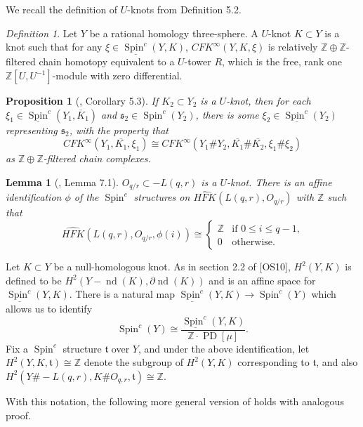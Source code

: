 \documentclass{article}
\newtheorem{lemma}[equation]{Lemma}
\newtheorem{proposition}[equation]{Proposition}
\theoremstyle{remark}
\newtheorem{definition}[equation]{Definition}
\numberwithin{equation}{section}
\numberwithin{table}{section}
\renewcommand{\frak}{\mathfrak}
\DeclareMathOperator{\Spin}{Spin}
\DeclareMathOperator{\nd}{nd}
\DeclareMathOperator{\PD}{PD}
\renewcommand{\(}{\left(}
\renewcommand{\)}{\right)}
\newcommand{\Z}{{\mathbb{Z}}}
\begin{document}
We recall the definition of $U$-knots from \cite{oz-sz-rational} Definition 5.2.

\begin{definition}
Let $Y$ be a rational homology three-sphere. A $U$-knot $K\subset Y$ is a knot such that for any $\xi\in\underline{\Spin^c}(Y,K)$, $CFK^\infty(Y,K,\xi)$ is relatively $\Z\oplus\Z$-filtered chain homotopy equivalent to a $U$-tower $R$, which is the free, rank one $\Z[U,U^{-1}]$-module with zero differential.
\end{definition}

\begin{proposition}[\cite{oz-sz-rational}, Corollary 5.3]
If $K_2\subset Y_2$ is a $U$-knot, then for each $\xi_1\in\underline{\Spin}^c(Y_1,\overline{K}_1)$ and $\frak s_2\in\Spin^c(Y_2)$, there is some $\xi_2\in\underline{\Spin^c}(Y_2)$ representing $\frak s_2$, with the property that
$$CFK^\infty(Y_1,\overline{K_1},\xi_1)\cong CFK^\infty(Y_1\#Y_2,\overline{K_1}\#\overline{K_2},\xi_1\#\xi_2)$$ as $\Z\oplus\Z$-filtered chain complexes.
\end{proposition}

\begin{lemma}[\cite{oz-sz-rational}, Lemma 7.1]
$O_{q/r}\subset -L(q,r)$ is a $U$-knot. There is an affine identification $\phi$ of the $\Spin^c$ structures on $\widehat{HFK}(L(q,r),O_{q/r})$ with $\Z$ such that
$$\widehat{HFK}(L(q,r),O_{q/r},\phi(i))\cong\begin{cases}
    \Z & \text{if $0\le i\le q-1$,} \\
    0 & \text{otherwise.}
\end{cases}$$
\end{lemma}

Let $K\subset Y$ be a null-homologous knot. As in section 2.2 of [OS10], $H^2(Y,K)$ is defined to be $H^2(Y-\nd(K),\partial\nd(K))$ and is an affine space for $\underline{\Spin^c}(Y,K)$. There is a natural map $\underline{\Spin^c}(Y,K)\to\Spin^c(Y)$ which allows us to identify $$\Spin^c(Y)\cong\frac{\underline{\Spin^c}(Y,K)}{\Z\cdot\PD[\mu]}.$$ Fix a $\Spin^c$ structure $\frak t$ over $Y$, and under the above identification, let $H^2(Y,K,\frak t)\cong\Z$ denote the subgroup of $H^2(Y,K)$ corresponding to $\frak t$, and also $H^2(Y\#-L(q,r),K\# O_{q,r},\frak t)\cong\Z$.

With this notation, the following more general version of \cite[Lemma 7.2]{oz-sz-rational} holds with analogous proof.
\end{document}
